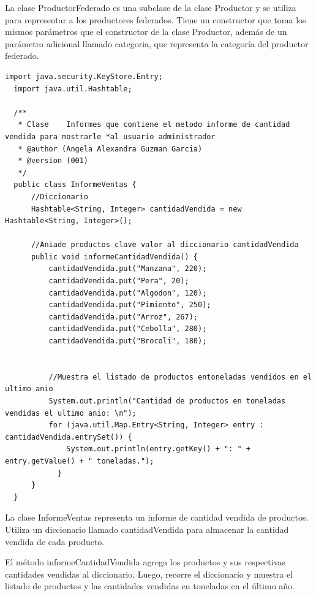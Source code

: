 \documentclass[10pt,a4paper]{article}
\def\StartLineAt#1{\lstset{firstnumber=#1}}
\begin{document}
La clase ProductorFederado es una subclase de la clase Productor y se utiliza para representar a los productores federados. Tiene un constructor que toma los mismos parámetros que el constructor de la clase Productor, además de un parámetro adicional llamado categoria, que representa la categoría del productor federado.


\StartLineAt{1}
\begin{lstlisting}[style=Java]
  import java.security.KeyStore.Entry;
  import java.util.Hashtable;
  
  /**
   * Clase    Informes que contiene el metodo informe de cantidad vendida para mostrarle *al usuario administrador
   * @author (Angela Alexandra Guzman Garcia) 
   * @version (001)
   */
  public class InformeVentas {
      //Diccionario  
      Hashtable<String, Integer> cantidadVendida = new Hashtable<String, Integer>();
  
      //Aniade productos clave valor al diccionario cantidadVendida
      public void informeCantidadVendida() {
          cantidadVendida.put("Manzana", 220);
          cantidadVendida.put("Pera", 20);
          cantidadVendida.put("Algodon", 120);
          cantidadVendida.put("Pimiento", 250);
          cantidadVendida.put("Arroz", 267);
          cantidadVendida.put("Cebolla", 280);
          cantidadVendida.put("Brocoli", 180);
          
  
          //Muestra el listado de productos entoneladas vendidos en el ultimo anio
          System.out.println("Cantidad de productos en toneladas vendidas el ultimo anio: \n");
          for (java.util.Map.Entry<String, Integer> entry : cantidadVendida.entrySet()) {
              System.out.println(entry.getKey() + ": " + entry.getValue() + " toneladas.");
            }
      }
  }  
\end{lstlisting}

La clase InformeVentas representa un informe de cantidad vendida de productos. Utiliza un diccionario llamado cantidadVendida para almacenar la cantidad vendida de cada producto.

El método informeCantidadVendida agrega los productos y sus respectivas cantidades vendidas al diccionario. Luego, recorre el diccionario y muestra el listado de productos y las cantidades vendidas en toneladas en el último año.
\end{document}

